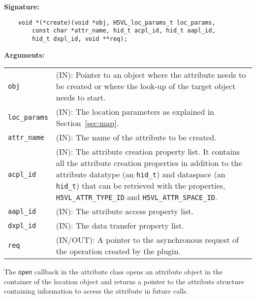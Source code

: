 \begin{mdframed}[style=bgbox]
\textbf{Signature:}
\begin{lstlisting}
    void *(*create)(void *obj, H5VL_loc_params_t loc_params, 
        const char *attr_name, hid_t acpl_id, hid_t aapl_id, 
        hid_t dxpl_id, void **req);
\end{lstlisting}

\textbf{Arguments:}\\
\begin{tabular}{l p{13.5cm}}
  \texttt{obj} & (IN): Pointer to an object where the attribute needs
  to be created or where the look-up of the target object needs to
  start.\\
  \texttt{loc\_params} & (IN): The location parameters as explained in
  Section~\ref{sec:map}.\\
  \texttt{attr\_name} & (IN): The name of the attribute to be created.\\
  \texttt{acpl\_id} & (IN): The attribute creation property list. It contains
  all the attribute creation properties in addition to the attribute
  datatype (an \texttt{hid\_t}) and dataspace (an \texttt{hid\_t}) that can
  be retrieved with the properties, \texttt{H5VL\_ATTR\_TYPE\_ID} and
  \texttt{H5VL\_ATTR\_SPACE\_ID}.\\
  \texttt{aapl\_id} & (IN): The attribute access property list.\\
  \texttt{dxpl\_id} & (IN): The data transfer property list.\\
  \texttt{req} & (IN/OUT): A pointer to the asynchronous request of the
  operation created by the plugin.\\
\end{tabular}
\end{mdframed}

The \texttt{open} callback in the attribute class opens an
attribute object in the container of the location object and returns a
pointer to the attribute structure containing information to access
the attribute in future calls. \bigskip

